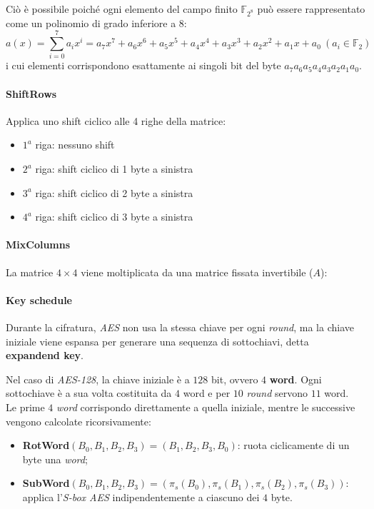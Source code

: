 \noindent Ciò è possibile poiché ogni elemento del campo finito $\mathbb{F}_{2^8}$ può essere rappresentato come un polinomio di grado inferiore a $8$:
\[
a(x) = \sum_{i=0}^{7} a_i x^i = a_7 x^7 + a_6 x^6 + a_5 x^5 + a_4 x^4 + a_3 x^3 + a_2 x^2 + a_1 x + a_0 \ (a_i \in \mathbb{F}_2)
\]
i cui elementi corrispondono esattamente ai singoli bit del byte $a_7 a_6 a_5 a_4 a_3 a_2 a_1 a_0$.

\paragraph{ShiftRows} Applica uno shift ciclico alle 4 righe della matrice:
\begin{itemize}
    \item $1^a$ riga: nessuno shift
    \item $2^a$ riga: shift ciclico di 1 byte a sinistra
    \item $3^a$ riga: shift ciclico di 2 byte a sinistra
    \item $4^a$ riga: shift ciclico di 3 byte a sinistra
\end{itemize}


\paragraph{MixColumns} La matrice $4 \times 4$ viene moltiplicata da una matrice fissata invertibile ($A$):


\paragraph{Key schedule} Durante la cifratura, \textit{AES} non usa la stessa chiave per ogni \textit{round}, ma la chiave iniziale viene espansa per generare una sequenza di sottochiavi, detta \textbf{expandend key}.  

\vspace{1em} \noindent Nel caso di \textit{AES-128}, la chiave iniziale è a $128$ bit, ovvero $4$ \textbf{word}. Ogni sottochiave è a sua volta costituita da $4$ word e per $10$ \textit{round} servono $11$ word. \\ Le prime $4$ \textit{word} corrispondo direttamente a quella iniziale, mentre le successive vengono calcolate ricorsivamente:
\begin{itemize}
    \item \textbf{RotWord}$(B_0, B_1, B_2, B_3) =(B_1, B_2, B_3, B_0)$: ruota ciclicamente di un byte una \textit{word};
    \item \textbf{SubWord}$(B_0, B_1, B_2, B_3)=(\pi_s(B_0),\pi_s(B_1),\pi_s(B_2),\pi_s(B_3))$: applica l'\textit{S-box AES} indipendentemente a ciascuno dei $4$ byte. 
\end{itemize}

